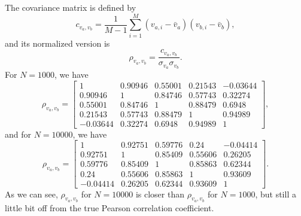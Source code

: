 The covariance matrix is defined by
%
\begin{equation}
    c_{v_a, v_b} = \frac{ 1 }{ M - 1 }
    \sum_{i=1}^M (v_{a,i} - \bar{v}_a) (v_{b,i} - \bar{v}_b),
\end{equation}
%
and its normalized version is
%
\begin{equation}
    \rho_{v_a, v_b} = \frac{ c_{v_a, v_b} }{ \sigma_{v_a} \sigma_{v_b} }.
\end{equation}
%
For \(N = 1000\), we have
%
\begin{equation}
    \rho_{v_a, v_b} = \begin{bmatrix}
        1        & 0.90946 & 0.55001 & 0.21543 & -0.03644 \\
        0.90946  & 1       & 0.84746 & 0.57743 & 0.32274  \\
        0.55001  & 0.84746 & 1       & 0.88479 & 0.6948   \\
        0.21543  & 0.57743 & 0.88479 & 1       & 0.94989  \\
        -0.03644 & 0.32274 & 0.6948  & 0.94989 & 1
    \end{bmatrix},
\end{equation}
%
and for \(N = 10000\), we have
%
\begin{equation}
    \rho_{v_a, v_b} = \begin{bmatrix}
        1        & 0.92751 & 0.59776 & 0.24    & -0.04414 \\
        0.92751  & 1       & 0.85409 & 0.55606 & 0.26205  \\
        0.59776  & 0.85409 & 1       & 0.85863 & 0.62344  \\
        0.24     & 0.55606 & 0.85863 & 1       & 0.93609  \\
        -0.04414 & 0.26205 & 0.62344 & 0.93609 & 1
    \end{bmatrix}.
\end{equation}
%
As we can see, \(\rho_{v_a, v_b}\) for \(N = 10000\) is closer than \(\rho_{v_a, v_b}\)
for \(N = 1000\), but still a little bit off from the true Pearson correlation coefficient.
